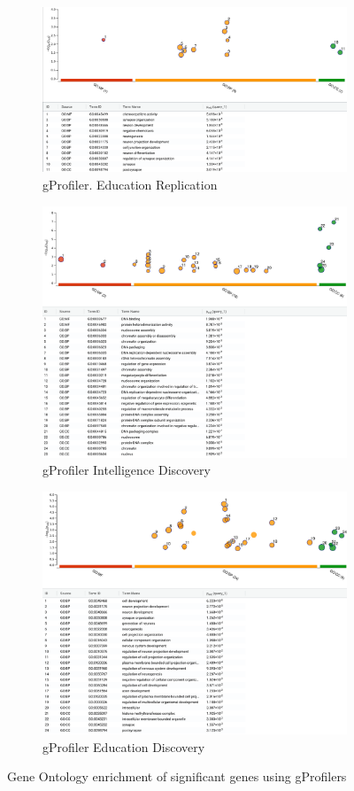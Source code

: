  \begin{figure}
  \begin{subfigure}{12cm}
    \centering\includegraphics[width=11cm]{images/gprofiler/gprofiler_ea2_clip.png}
    \caption{gProfiler. Education Replication}
    \end{subfigure}
    
  \begin{subfigure}{12cm}
    \centering\includegraphics[width=11cm]{images/gprofiler/gprofiler_ukbbint_clip.png}
    \caption{gProfiler Intelligence Discovery}
  \end{subfigure}
 
  \begin{subfigure}{12cm}
    \centering\includegraphics[width=11cm]{images/gprofiler/gprofiler_eukbbed_clip.png}
    \caption{gProfiler Education Discovery}
  \end{subfigure}
  \caption{Gene Ontology enrichment of significant genes using gProfilers}
  \label{fig:gProfiler 3 samples}
  

\end{figure}
